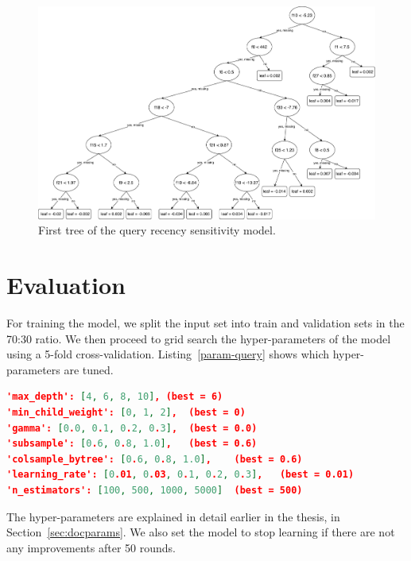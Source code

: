 \begin{figure}
  \centering
  \includegraphics[width=\linewidth]{img/tree.pdf}
  \caption{First tree of the query recency sensitivity model.}
  \label{fig:query_tree0}
\end{figure}

\section{Evaluation}
For training the model, we split the input set into train and validation sets in the 70:30 ratio. We then proceed to grid search the hyper-parameters of the model using a 5-fold cross-validation. Listing~\ref{param-query} shows which hyper-parameters are tuned.

\begin{lstlisting}[language=json,caption=Hyper-parameter tuning for the query recency sensitivity model.,label=param-query]
'max_depth': [4, 6, 8, 10],	(best = 6)
'min_child_weight': [0, 1, 2],	(best = 0)
'gamma': [0.0, 0.1, 0.2, 0.3],	(best = 0.0)
'subsample': [0.6, 0.8, 1.0],	(best = 0.6)
'colsample_bytree': [0.6, 0.8, 1.0],	(best = 0.6)
'learning_rate': [0.01, 0.03, 0.1, 0.2, 0.3],	(best = 0.01)
'n_estimators': [100, 500, 1000, 5000]	(best = 500)
\end{lstlisting}


The hyper-parameters are explained in detail earlier in the thesis, in Section~\ref{sec:docparams}. We also set the model to stop learning if there are not any improvements after 50 rounds.

